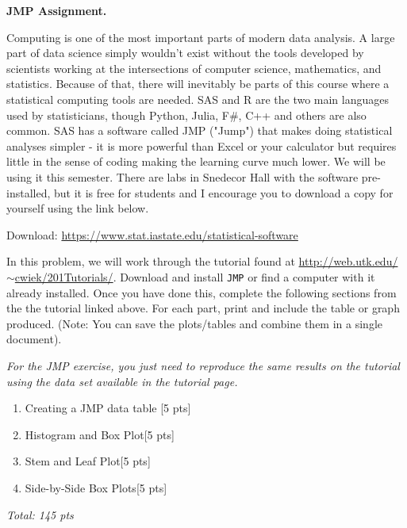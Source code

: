 \documentclass[11pt]{article}\usepackage[]{graphicx}\usepackage[]{color}
\begin{document}

\item \textbf{JMP Assignment.} 

   Computing is one of the most important parts of modern data analysis. A large part of data science simply wouldn't exist without the tools developed by scientists working at the intersections of computer science, mathematics, and statistics. 
   Because of that, there will inevitably be parts of this course where a statistical computing tools are needed. SAS and R are the two main languages used by statisticians, though Python, Julia, F\#, C++ and others are also common.
   SAS has a software called JMP ("Jump") that makes doing statistical analyses simpler - it is more powerful than Excel or your calculator but requires little in the sense of coding making the learning curve much lower. 
   We will be using it this semester. There are labs in Snedecor Hall with the software pre-installed, but it is free for students and I encourage you to download a copy for yourself using the link below.

   Download: \href{https://www.stat.iastate.edu/statistical-software}{https://www.stat.iastate.edu/statistical-software}

   In this problem, we will work through the tutorial found at \href{http://web.utk.edu/~cwiek/201Tutorials/}{http://web.utk.edu/$\sim$cwiek/201Tutorials/}. Download and install \texttt{JMP} or find a computer with it already installed. Once you have done this, complete the following sections from the the tutorial linked above. For each part, print and include the table or graph produced. (Note: You can save the plots/tables and combine them in a single document).

\emph{For the JMP exercise, you just need to reproduce the same results on the tutorial using the data set available in the tutorial page.}
   \begin{enumerate}
      \item Creating a JMP data table [5 pts]
      \item Histogram and Box Plot[5 pts]
      \item Stem and Leaf Plot[5 pts]
      \item Side-by-Side Box Plots[5 pts]
   \end{enumerate}



\emph{Total: 145 pts}
\end{document}
